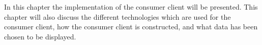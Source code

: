 In this chapter the implementation of the consumer client will be presented.
This chapter will also discuss the different technologies which are used for the consumer client, how the consumer client is constructed, and what data has been chosen to be displayed.
